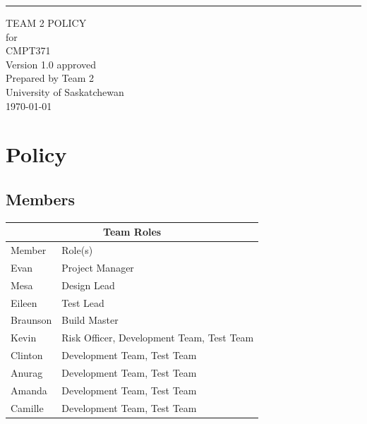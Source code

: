 \documentclass{scrreprt}
\date{}
\def\myversion{1.0 }
\begin{document}
\graphicspath{ {images/} }

\begin{flushright}
    \rule{16cm}{5pt}\vskip1cm
    \begin{bfseries}
        \Huge{TEAM 2 POLICY}\\
        \vspace{1.9cm}
        for\\
        \vspace{1.9cm}
        CMPT371\\
        \vspace{1.9cm}
        \LARGE{Version \myversion approved}\\
        \vspace{1.9cm}
        Prepared by Team 2\\
        \vspace{1.9cm}
        University of Saskatchewan\\
        \vspace{1.9cm}
        \today\\
    \end{bfseries}
\end{flushright}

\tableofcontents

\chapter{Policy}

\section{Members}

\begin{table}[h!]
\centering
\begin{tabular}{ |p{2cm}||p{8cm}|  }
    \hline
    \multicolumn{2}{|c|}{Team Roles} \\
    \hline
    Member & Role(s)\\
    \hline
    Evan & Project Manager\\
    Mesa & Design Lead\\
    Eileen & Test Lead\\
    Braunson & Build Master\\
    Kevin & Risk Officer, Development Team, Test Team\\
    Clinton & Development Team, Test Team\\
    Anurag & Development Team, Test Team\\
    Amanda & Development Team, Test Team\\
    Camille & Development Team, Test Team\\
    \hline
\end{tabular}
\end{table}
\end{document}
